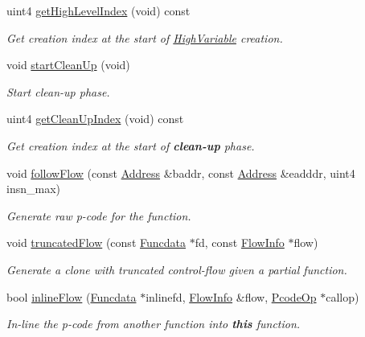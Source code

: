 \begin{DoxyCompactItemize}
uint4 \mbox{\hyperlink{class_funcdata_a336622e6dcb32a1539d3d98c4115ead8}{get\+High\+Level\+Index}} (void) const
\begin{DoxyCompactList}\small\item\em Get creation index at the start of \mbox{\hyperlink{class_high_variable}{High\+Variable}} creation. \end{DoxyCompactList}\item 
void \mbox{\hyperlink{class_funcdata_a29e446945c2081176890607173cbb461}{start\+Clean\+Up}} (void)
\begin{DoxyCompactList}\small\item\em Start {\itshape clean-\/up} phase. \end{DoxyCompactList}\item 
uint4 \mbox{\hyperlink{class_funcdata_a960bb129d667590b2f3eb73b99984954}{get\+Clean\+Up\+Index}} (void) const
\begin{DoxyCompactList}\small\item\em Get creation index at the start of {\bfseries{clean-\/up}} phase. \end{DoxyCompactList}\item 
void \mbox{\hyperlink{class_funcdata_a91b3b1d1d751868c394eda804afa0bc8}{follow\+Flow}} (const \mbox{\hyperlink{class_address}{Address}} \&baddr, const \mbox{\hyperlink{class_address}{Address}} \&eadddr, uint4 insn\+\_\+max)
\begin{DoxyCompactList}\small\item\em Generate raw p-\/code for the function. \end{DoxyCompactList}\item 
void \mbox{\hyperlink{class_funcdata_a122718ad87c13b714676c61050461388}{truncated\+Flow}} (const \mbox{\hyperlink{class_funcdata}{Funcdata}} $\ast$fd, const \mbox{\hyperlink{class_flow_info}{Flow\+Info}} $\ast$flow)
\begin{DoxyCompactList}\small\item\em Generate a clone with truncated control-\/flow given a partial function. \end{DoxyCompactList}\item 
bool \mbox{\hyperlink{class_funcdata_a3bcc11dc2a2eefa48bc4b244094a521f}{inline\+Flow}} (\mbox{\hyperlink{class_funcdata}{Funcdata}} $\ast$inlinefd, \mbox{\hyperlink{class_flow_info}{Flow\+Info}} \&flow, \mbox{\hyperlink{class_pcode_op}{Pcode\+Op}} $\ast$callop)
\begin{DoxyCompactList}\small\item\em In-\/line the p-\/code from another function into {\bfseries{this}} function. \end{DoxyCompactList}\item 

\end{DoxyCompactItemize}
